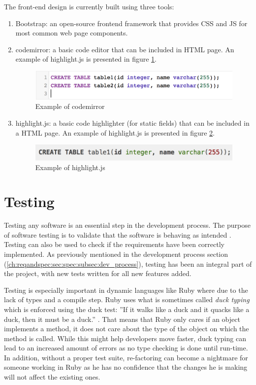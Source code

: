 The front-end design is currently built using three tools:
\begin{enumerate}
    \item Bootstrap: an open-source frontend framework that provides CSS and JS for most common web page components.
    \item codemirror: a basic code editor that can be included in HTML page. An example of highlight.js is presented in figure \ref{fig:codemirror}.
\begin{figure}
    \centering
    \includegraphics[width=\textwidth]{Chapters/5-Implementation/codemirror.png}
    \caption{Example of codemirror}
    \label{fig:codemirror}
\end{figure}
    \item  highlight.js: a basic code highlighter (for static fields) that can be included in a HTML page. An example of highlight.js is presented in figure \ref{fig:highlightjs}.
\begin{figure}
    \centering
    \includegraphics[width=\textwidth]{Chapters/5-Implementation/higlightjs.png}
    \caption{Example of highlight.js}
    \label{fig:highlightjs}
\end{figure}
\end{enumerate}

\section{Testing}
Testing any software is an essential step in the development process. The purpose of software testing is to validate that the software is behaving as intended \citep{lit:software_testing}. Testing can also be used to check if the requirements have been correctly implemented. As previously mentioned in the development process section (\ref{ch:reqandspec:sec:spec:subsec:dev_process}), testing has been an integral part of the project, with new tests written for all new features added.

Testing is especially important in dynamic languages like Ruby where due to the lack of types and a compile step. Ruby uses what is sometimes called \textit{duck typing} which is enforced using the duck test: ''If it walks like a duck and it quacks like a duck, then it must be a duck.'' \citep{wiki:duck_typing}. That means that Ruby only cares if an object implements a method, it does not care about the type of the object on which the method is called. While this might help developers move faster, duck typing can lead to an increased amount of errors as no type checking is done until run-time. In addition, without a proper test suite, re-factoring can become a nightmare for someone working in Ruby as he has no confidence that the changes he is making will not affect the existing ones.


